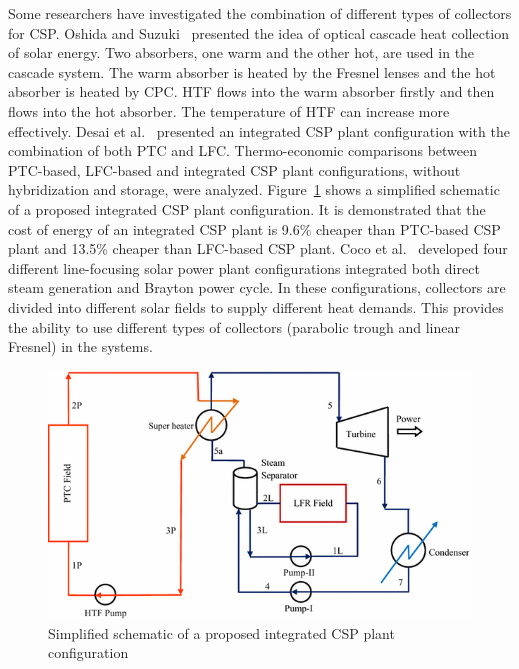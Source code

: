 Some researchers have investigated the combination of different types of collectors for CSP.
Oshida and Suzuki~\cite{Oshida1987} presented the idea of optical cascade heat collection of solar energy. Two absorbers, one warm and the other hot, are used in the cascade system. The warm absorber is heated by the Fresnel lenses and the hot absorber is heated by CPC. HTF flows into the warm absorber firstly and then flows into the hot absorber. The temperature of HTF can increase more effectively.
Desai et al.~\cite{Desai2015} presented an integrated CSP plant configuration with the combination of both PTC and LFC. Thermo-economic comparisons between PTC-based, LFC-based and integrated CSP plant configurations, without hybridization and storage, were analyzed. Figure~\ref{fig:Desai2015} shows a simplified schematic of a proposed integrated CSP plant configuration. It is demonstrated that the cost of energy of an integrated CSP plant is 9.6\% cheaper than PTC-based CSP plant and 13.5\% cheaper than LFC-based CSP plant.
Coco et al.~\cite{Coco2015} developed four different line-focusing solar power plant configurations integrated both direct steam generation and Brayton power cycle. In these configurations, collectors are divided into different solar fields to supply different heat demands. This provides the ability to use different types of collectors (parabolic trough and linear Fresnel) in the systems.

\begin{figure}[!ht]
\centering
\includegraphics[width=.8\textwidth]{fig/Desai2015.jpg}
\caption{Simplified schematic of a proposed integrated CSP plant configuration}\label{fig:Desai2015}
\end{figure}

